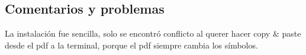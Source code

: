 \documentclass{exam}
\begin{document}
\subsection*{Comentarios y problemas}

La instalación fue sencilla, solo se encontró conflicto al querer hacer copy \& paste desde el pdf a la terminal, porque el pdf siempre cambia los símbolos.
\end{document}
